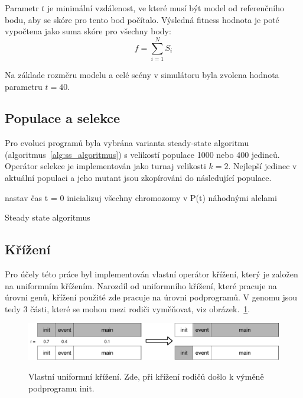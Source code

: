 Parametr $t$ je minimální vzdálenost, ve které musí být model od referenčního bodu, aby se skóre pro tento bod počítalo.
Výsledná fitness hodnota je poté vypočtena jako suma skóre pro všechny body:
$$f=\sum_{i=1}^{N}S_i$$

Na základe rozměru modelu a celé scény v simulátoru byla zvolena hodnota parametru $t = 40$.

\subsection{Populace a selekce}
Pro evoluci programů byla vybrána varianta steady-state algoritmu (algoritmus~\ref{alg:ss_algoritmus}) s velikostí populace 1000 nebo 400 jedinců.
Operátor selekce je implementován jako turnaj velikosti $k = 2$.
Nejlepší jedinec v aktuální populaci a jeho mutant jsou zkopírováni do následující populace.

\begin{algorithm}[H]

    nastav čas t = 0\;
    inicializuj všechny chromozomy v P(t) náhodnými alelami\;

    \caption{Steady state algoritmus}
    \label{alg:ss_algoritmus}
\end{algorithm}

\subsection{Křížení}
Pro účely této práce byl implementován vlastní operátor křížení, který je založen na uniformním křížením.
Narozdíl od uniformního křížení, které pracuje na úrovni genů, křížení použité zde pracuje na úrovni podprogramů.
V genomu jsou tedy 3 části, které se mohou mezi rodiči vyměňovat, viz obrázek.~\ref{fig:krizeni_podprogramu}.

\begin{figure}[h]
    \centering
    {\includegraphics[width=35em]{obrazky/krizeni_podprogramu.pdf}}
    \caption{
    Vlastní uniformní křížení.
    Zde, při křížení rodičů došlo k výměně podprogramu init.
    }
    \label{fig:krizeni_podprogramu}
\end{figure}

